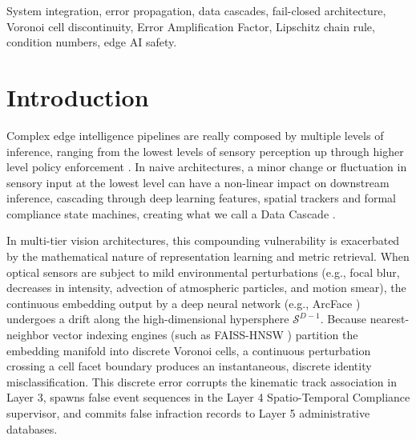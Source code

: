 \documentclass[conference]{IEEEtran}
\begin{document}
\begin{IEEEkeywords}
System integration, error propagation, data cascades, fail-closed architecture, Voronoi cell discontinuity, Error Amplification Factor, Lipschitz chain rule, condition numbers, edge AI safety.
\end{IEEEkeywords}

\section{Introduction}
Complex edge intelligence pipelines are really composed by multiple levels of inference, ranging from the lowest levels of sensory perception up through higher level policy enforcement \cite{sculley2015hidden, sambasivan2021everyone, leveson1995safeware}. In naive architectures, a minor change or fluctuation in sensory input at the lowest level can have a non-linear impact on downstream inference, cascading through deep learning features, spatial trackers and formal compliance state machines, creating what we call a Data Cascade \cite{sambasivan2021everyone}. 

In multi-tier vision architectures, this compounding vulnerability is exacerbated by the mathematical nature of representation learning and metric retrieval. When optical sensors are subject to mild environmental perturbations (e.g., focal blur, decreases in intensity, advection of atmospheric particles, and motion smear), the continuous embedding output by a deep neural network (e.g., ArcFace \cite{deng2019arcface}) undergoes a drift along the high-dimensional hypersphere $\mathcal{S}^{D-1}$. Because nearest-neighbor vector indexing engines (such as FAISS-HNSW \cite{malkov2018efficient}) partition the embedding manifold into discrete Voronoi cells, a continuous perturbation crossing a cell facet boundary produces an instantaneous, discrete identity misclassification. This discrete error corrupts the kinematic track association in Layer 3, spawns false event sequences in the Layer 4 Spatio-Temporal Compliance supervisor, and commits false infraction records to Layer 5 administrative databases.
\end{document}
